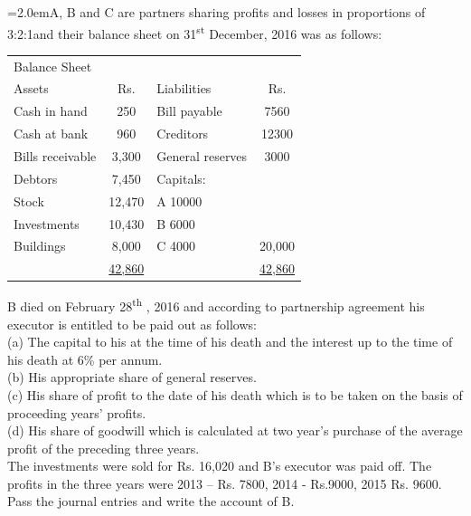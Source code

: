 \documentclass[11pt,a4paper]{article}
\newcommand{\lqn}[2]{\Needspace{6\baselineskip}\par\medskip\noindent\hangindent=2.0em\hangafter=1\makebox[2.0em][l]{\textbf{#1.}}#2\par}
\begin{document}
\lqn{105}{A, B and C are partners sharing profits and losses in proportions of 3:2:1and their balance sheet on 31\textsuperscript{st} December, 2016 was as follows:\par
\par\smallskip\noindent\hspace*{1.2em}\begin{tabular}{|lclc|}
\hline
Balance Sheet &  &  &  \\
Assets & Rs. & Liabilities & Rs. \\
Cash in hand & 250 & Bill payable & 7560 \\
Cash at bank & 960 & Creditors & 12300 \\
Bills receivable & 3,300 & General reserves & 3000 \\
Debtors & 7,450 & Capitals: &  \\
Stock & 12,470 & A               10000 &  \\
Investments & 10,430 & B               6000 &  \\
Buildings & 8,000 & C               4000 & 20,000 \\
 & \underline{42,860} &  & \underline{42,860} \\
\hline
\end{tabular}\par\smallskip
B died on February 28\textsuperscript{th} , 2016 and according to partnership agreement his executor is entitled to be paid out as follows:\\
(a) The capital to his at the time of his death and the interest up to the time of his death at 6\% per annum.\\
(b) His appropriate share of general reserves.\\
(c) His share of profit to the date of his death which is to be taken on the basis of proceeding years’ profits.\\
(d) His share of goodwill which is calculated at two year’s purchase of the average profit of the preceding three years.\\
The investments were sold for Rs. 16,020 and B’s executor was paid off. The profits in the three years were 2013 – Rs. 7800, 2014 - Rs.9000, 2015 Rs. 9600.\\
Pass the journal entries and write the account of B.\par
}
\end{document}

